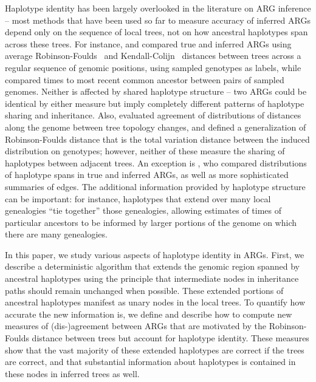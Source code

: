 \documentclass[10pt,twoside,lineno]{gsajnl}
\begin{document}
Haplotype identity has been largely overlooked in the literature on ARG inference --
most methods that have been used so far to measure accuracy of inferred ARGs
depend only on the sequence of local trees,
not on how ancestral haplotypes span across these trees.
For instance, \citet{kelleher2019inferring} and \citet{zhang2023biobankscale}
compared true and inferred ARGs
using average Robinson-Foulds~\citep{robinson1981comparison} and 
Kendall-Colijn~\citep{kendall2016mapping} distances between trees
across a regular sequence of genomic positions,
using sampled genotypes as labels,
while \citet{brandt2022evaluation} compared times to most recent common ancestor
between pairs of sampled genomes.
Neither is affected by shared haplotype structure --
two ARGs could be identical by either measure
but imply completely different patterns of haplotype sharing and inheritance.
Also, \citet{deng2021distribution} evaluated agreement of distributions of
distances along the genome between tree topology changes, and
\citet{zhang2023biobankscale} defined a generalization of Robinson-Foulds distance
that is the total variation distance between the induced distribution on genotypes;
however, neither of these measure the sharing of haplotypes between adjacent trees.
An exception is
\citet{ignatieva2024length}, who compared distributions of haplotype spans in true and inferred ARGs,
as well as more sophisticated summaries of edges.
The additional information provided by haplotype structure can be important:
for instance, haplotypes that extend over many local genealogies
``tie together'' those genealogies, allowing estimates of times of particular ancestors
to be informed by larger portions of the genome on which there are many genealogies.

In this paper, we study various aspects of haplotype identity in ARGs.
First, we describe a deterministic algorithm that
extends the genomic region spanned by ancestral haplotypes
using the principle that intermediate nodes in inheritance paths
should remain unchanged when possible.
These extended portions of ancestral haplotypes manifest as unary nodes in the local trees.
To quantify how accurate the new information is,
we define and describe how to compute new measures of (dis-)agreement between ARGs
that are motivated by the Robinson-Foulds distance between trees
but account for haplotype identity.
These measures show that the vast majority of these extended haplotypes are correct if the trees are correct,
and that substantial information about haplotypes is contained in these nodes
in inferred trees as well.
\end{document}
